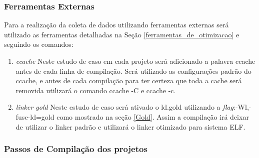 \subsubsection{Ferramentas Externas}

	Para a realização da coleta de dados utilizando ferramentas
 externas será utilizado as ferramentas detalhadas na Seção 
\ref{ferramentas_de_otimizacao} e seguindo os comandos:

        \begin{enumerate}
               \item \textit{ccache}
                    \subitem Neste estudo de caso em cada projeto será adicionado
 a palavra ccache antes de cada linha de compilação. Será utilizado as
 configurações padrão do ccache, e antes de cada compilação para ter certeza
 que toda a cache será removida utilizará o comando ccache -C e ccache -c.
                \item \textit{linker gold}
                    \subitem Neste estudo de caso será ativado o ld.gold
 utilizando a \textit{flag}:-Wl,-fuse-ld=gold como mostrado na seção \ref{Gold}. Assim  a
 compilação irá deixar de utilizar o linker padrão e utilizará o linker
 otimizado para sistema ELF.
        \end{enumerate}

\subsubsection{Passos de Compilação dos projetos}


